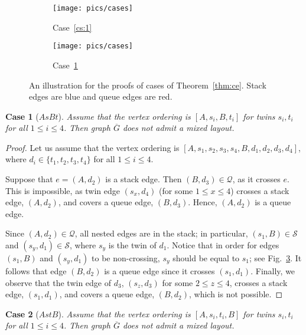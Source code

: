 \documentclass[orivec]{llncs}
\newcommand{\Sh}{{\ensuremath{\mathcal{S}}}}
\newcommand{\Qh}{{\ensuremath{\mathcal{Q}}}}
\newcommand{\Gc}{{\ensuremath{\overline{G}}}}
\newtheorem{cs}{Case}
\begin{document}
\begin{figure}[t]
    \centering
    \begin{subfigure}[b]{.4\linewidth}
        \texttt{[image: pics/cases]}
        \caption{Case~\ref{cs:1}}
        \label{fig:case1}
    \end{subfigure}
    \hfill
    \begin{subfigure}[b]{.4\linewidth}
        \texttt{[image: pics/cases]}
        \caption{Case~\ref{cs:4}}
        \label{fig:case4}
    \end{subfigure}
    \caption{An illustration for the proofs of cases of Theorem~\ref{thm:ce}. 
        Stack edges are blue and queue edges are red.}
\end{figure}

\begin{cs}[$AsBt$]
    \label{cs:4}
    Assume that the vertex ordering is $[A, s_i, B, t_i]$ for twins $s_i, t_i$ for all $1 \le i \le 4$.
    Then graph $\Gc$ does not admit a mixed layout.
\end{cs}

\begin{proof}
    Let us assume that the vertex ordering is $[A, s_1, s_2, s_3, s_4, B, d_1, d_2, d_3, d_4]$, where 
    $d_i \in \{t_1, t_2, t_3, t_4\}$ for all $1 \le i \le 4$.

    Suppose that $e=(A, d_2)$ is a stack edge. Then $(B, d_3) \in \Qh$, as it crosses $e$.
    This is impossible, as twin edge $(s_x, d_4)$ (for some $1\le x \le 4$) crosses a stack edge, $(A, d_2)$, 
    and covers a queue edge, $(B, d_3)$. Hence, $(A, d_2)$ is a queue edge.
    
    Since $(A, d_2) \in \Qh$, all nested edges are in the stack; in particular, $(s_1, B) \in \Sh$ and $(s_y, d_1) \in \Sh$, where
    $s_y$ is the twin of $d_1$. Notice that in order for edges $(s_1, B)$ and $(s_y, d_1)$ to be non-crossing, 
    $s_y$ should be equal to $s_1$; see Fig.~\ref{fig:case4}. It follows that edge $(B, d_2)$ is a queue edge since
    it crosses $(s_1, d_1)$.
    Finally, we observe that the twin edge of $d_3$, $(s_z, d_3)$ for some $2 \le z \le 4$,
    crosses a stack edge, $(s_1, d_1)$, and covers a queue edge, $(B, d_2)$, which is not possible.
\end{proof}    

\begin{cs}[$AstB$]
    \label{cs:3}
    Assume that the vertex ordering is $[A, s_i, t_i, B]$ for twins $s_i, t_i$ for all $1 \le i \le 4$.
    Then graph $\Gc$ does not admit a mixed layout.
\end{cs}
\end{document}

